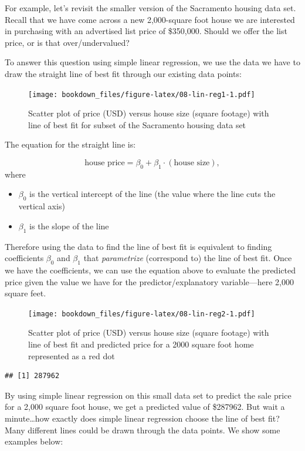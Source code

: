 \documentclass[
]{krantz}
\providecommand{\tightlist}{%
  \setlength{\itemsep}{0pt}\setlength{\parskip}{0pt}}
\begin{document}
For example, let's revisit the smaller version of the Sacramento housing data
set. Recall that we have come across a new 2,000-square foot house we are interested
in purchasing with an advertised list price of
\$350,000. Should we offer the list price, or is that over/undervalued?

To answer this question using simple linear regression, we use the data we have
to draw the straight line of best fit through our existing data points:

\begin{figure}
\centering
\texttt{[image: bookdown\_files/figure-latex/08-lin-reg1-1.pdf]}
\caption{\label{fig:08-lin-reg1}Scatter plot of price (USD) versus house size (square footage) with line of best fit for subset of the Sacramento housing data set}
\end{figure}

The equation for the straight line is:

\[\text{house price} = \beta_0 + \beta_1 \cdot (\text{house size}),\]
where

\begin{itemize}
\tightlist
\item
  \(\beta_0\) is the vertical intercept of the line (the value where the line cuts the vertical axis)
\item
  \(\beta_1\) is the slope of the line
\end{itemize}

Therefore using the data to find the line of best fit is equivalent to finding coefficients
\(\beta_0\) and \(\beta_1\) that \emph{parametrize} (correspond to) the line of best fit.
Once we have the coefficients, we can use the equation above to evaluate the predicted price given the value we
have for the predictor/explanatory variable---here 2,000 square feet.

\begin{figure}
\centering
\texttt{[image: bookdown\_files/figure-latex/08-lin-reg2-1.pdf]}
\caption{\label{fig:08-lin-reg2}Scatter plot of price (USD) versus house size (square footage) with line of best fit and predicted price for a 2000 square foot home represented as a red dot}
\end{figure}

\begin{verbatim}
## [1] 287962
\end{verbatim}

By using simple linear regression on this small data set to predict the sale price
for a 2,000 square foot house, we get a predicted value of
\$287962. But wait a minute\ldots how
exactly does simple linear regression choose the line of best fit? Many
different lines could be drawn through the data points. We show some examples
below:
\end{document}
